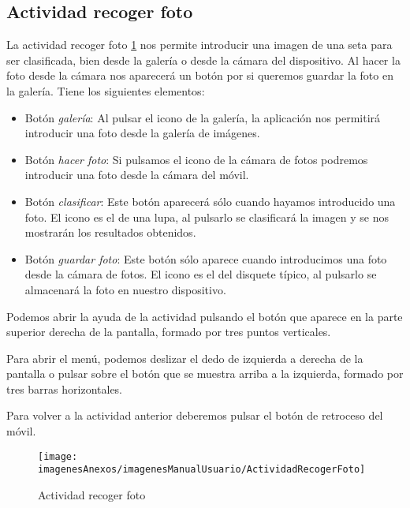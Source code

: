 \subsection{Actividad recoger foto}

La actividad recoger foto \ref{figActividadRecogerFoto} nos permite introducir una imagen de una seta para ser clasificada, bien desde la galería o desde la cámara del dispositivo. Al hacer la foto desde la cámara nos aparecerá un botón por si queremos guardar la foto en la galería. Tiene los siguientes elementos:

\begin{itemize}
	\item Botón \textit{galería}: Al pulsar el icono de la galería, la aplicación nos permitirá introducir una foto desde la galería de imágenes.
	\item Botón \textit{hacer foto}: Si pulsamos el icono de la cámara de fotos podremos introducir una foto desde la cámara del móvil.
	\item Botón \textit{clasificar}: Este botón aparecerá sólo cuando hayamos introducido una foto. El icono es el de una lupa, al pulsarlo se clasificará la imagen y se nos mostrarán los resultados obtenidos.
	\item Botón \textit{guardar foto}: Este botón sólo aparece cuando introducimos una foto desde la cámara de fotos. El icono es el del disquete típico, al pulsarlo se almacenará la foto en nuestro dispositivo.
\end{itemize}

Podemos abrir la ayuda de la actividad pulsando el botón que aparece en la parte superior derecha de la pantalla, formado por tres puntos verticales.

Para abrir el menú, podemos deslizar el dedo de izquierda a derecha de la pantalla o pulsar sobre el botón que se muestra arriba a la izquierda, formado por tres barras horizontales.

Para volver a la actividad anterior deberemos pulsar el botón de retroceso del móvil.

\begin{figure}[h]
    \begin{center}%
        \begin{center}%
          \texttt{[image: imagenesAnexos/imagenesManualUsuario/ActividadRecogerFoto]}%
          \caption{Actividad recoger foto}%
          \label{figActividadRecogerFoto}%
        \end{center}%
  	\end{center}%
\end{figure}%
\newpage

